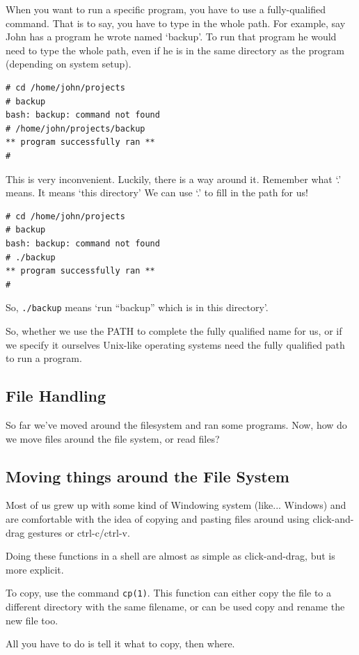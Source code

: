 When you want to run a specific program, you have to use a fully-qualified command. 
That is to say, you have to type in the whole path. For example, say John has a program he
wrote named `backup'. To run that program he would need to type the whole path, 
even if he is in the same directory as the program (depending on system setup).
{\tt \begin{verbatim}
# cd /home/john/projects
# backup
bash: backup: command not found
# /home/john/projects/backup
** program successfully ran **
#
\end{verbatim}
}
This is very inconvenient. Luckily, there is a way around it. Remember what `.' means.  It means `this directory'
We can use `.' to fill in the path for us!

{\tt \begin{verbatim}
# cd /home/john/projects
# backup
bash: backup: command not found
# ./backup
** program successfully ran **
#
\end{verbatim}
}

So, {\tt ./backup} means `run ``backup'' which is in this directory'.

So, whether we use the PATH to complete the fully qualified name for us, or if we specify it ourselves
Unix-like operating systems need the fully qualified path to run a program.

\subsection {File Handling}
So far we've moved around the filesystem and ran some programs. Now, how do we move
files around the file system, or read files?

\subsection{Moving things around the File System}
Most of us grew up with some kind of Windowing system (like... Windows)
and are comfortable with the idea of copying and pasting files around 
using click-and-drag gestures or ctrl-c/ctrl-v.

Doing these functions in a shell are almost as simple as 
click-and-drag, but is more explicit.

To copy, use the command {\tt cp(1)}. This function can either copy the file to a different 
directory with the same filename, or can be used copy and rename the new file too.

All you have to do is tell it what to copy, then where. 

